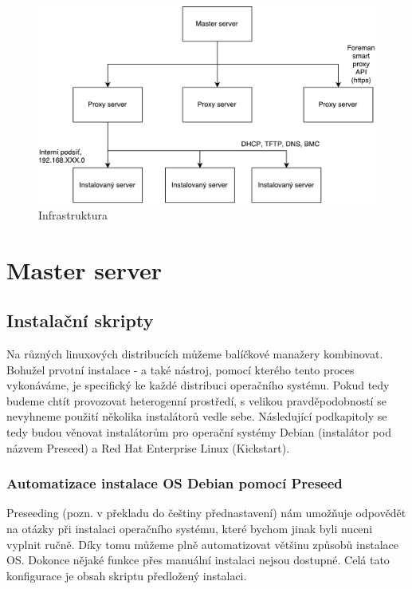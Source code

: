 \documentclass[thesis=B,czech]{FITthesis}[2012/06/26]
\begin{document}
\begin{figure}[h]\centering
\includegraphics[width=1\textwidth]{files/infrastruktura-v2.pdf}
	\caption{Infrastruktura}\label{fig:float}
\end{figure}



\section{Master server}



\subsection{Instalační skripty}

Na různých linuxových distribucích můžeme balíčkové manažery kombinovat. Bohužel prvotní instalace - a také nástroj, pomocí kterého tento proces vykonáváme, je specifický ke každé distribuci operačního systému. Pokud tedy budeme chtít provozovat heterogenní prostředí, s velikou pravděpodobností se nevyhneme použití několika instalátorů vedle sebe. Následující podkapitoly se tedy budou věnovat instalátorům pro operační systémy Debian (instalátor pod názvem Preseed) a Red Hat Enterprise Linux (Kickstart).

\subsubsection{Automatizace instalace OS Debian pomocí Preseed}

Preseeding (pozn. v překladu do češtiny přednastavení) nám umožňuje odpovědět na otázky při instalaci operačního systému, které bychom jinak byli nuceni vyplnit ručně. Díky tomu můžeme plně automatizovat většinu způsobů instalace OS. Dokonce nějaké funkce přes manuální instalaci nejsou dostupné. Celá tato konfigurace je obsah skriptu předložený instalaci.
\end{document}
